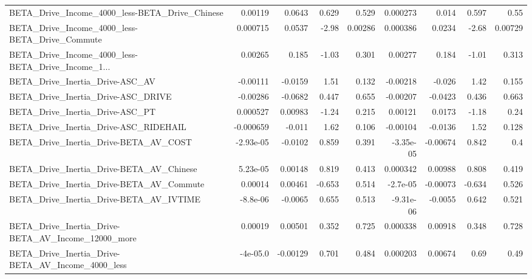 \begin{tabular}{lrrrrrrrr}
BETA\_Drive\_Income\_4000\_less-BETA\_Drive\_Chinese     &     0.00119 &       0.0643 &    0.629 &    0.529 &   0.000273 &       0.014 &        0.597 &          0.55 \\
BETA\_Drive\_Income\_4000\_less-BETA\_Drive\_Commute     &    0.000715 &       0.0537 &    -2.98 &  0.00286 &   0.000386 &      0.0234 &        -2.68 &       0.00729 \\
BETA\_Drive\_Income\_4000\_less-BETA\_Drive\_Income\_1... &     0.00265 &        0.185 &    -1.03 &    0.301 &    0.00277 &       0.184 &        -1.01 &         0.313 \\
BETA\_Drive\_Inertia\_Drive-ASC\_AV                    &    -0.00111 &      -0.0159 &     1.51 &    0.132 &   -0.00218 &      -0.026 &         1.42 &         0.155 \\
BETA\_Drive\_Inertia\_Drive-ASC\_DRIVE                 &    -0.00286 &      -0.0682 &    0.447 &    0.655 &   -0.00207 &     -0.0423 &        0.436 &         0.663 \\
BETA\_Drive\_Inertia\_Drive-ASC\_PT                    &    0.000527 &      0.00983 &    -1.24 &    0.215 &    0.00121 &      0.0173 &        -1.18 &          0.24 \\
BETA\_Drive\_Inertia\_Drive-ASC\_RIDEHAIL              &   -0.000659 &       -0.011 &     1.62 &    0.106 &   -0.00104 &     -0.0136 &         1.52 &         0.128 \\
BETA\_Drive\_Inertia\_Drive-BETA\_AV\_COST              &   -2.93e-05 &      -0.0102 &    0.859 &    0.391 &  -3.35e-05 &    -0.00674 &        0.842 &           0.4 \\
BETA\_Drive\_Inertia\_Drive-BETA\_AV\_Chinese           &    5.23e-05 &      0.00148 &    0.819 &    0.413 &   0.000342 &     0.00988 &        0.808 &         0.419 \\
BETA\_Drive\_Inertia\_Drive-BETA\_AV\_Commute           &     0.00014 &      0.00461 &   -0.653 &    0.514 &   -2.7e-05 &    -0.00073 &       -0.634 &         0.526 \\
BETA\_Drive\_Inertia\_Drive-BETA\_AV\_IVTIME            &    -8.8e-06 &      -0.0065 &    0.655 &    0.513 &  -9.31e-06 &     -0.0055 &        0.642 &         0.521 \\
BETA\_Drive\_Inertia\_Drive-BETA\_AV\_Income\_12000\_more &     0.00019 &      0.00501 &    0.352 &    0.725 &   0.000338 &     0.00918 &        0.348 &         0.728 \\
BETA\_Drive\_Inertia\_Drive-BETA\_AV\_Income\_4000\_less  &    -4e-05.0 &     -0.00129 &    0.701 &    0.484 &   0.000203 &     0.00674 &         0.69 &          0.49 \\

\end{tabular}
